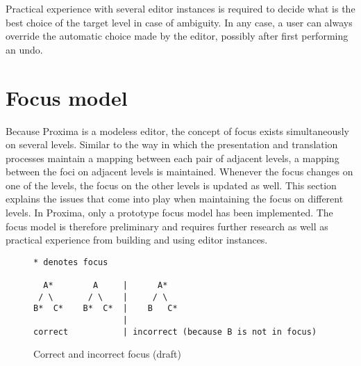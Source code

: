 Practical experience with several editor instances is required to decide what is the best choice of the target level in case of ambiguity. In any case, a user can always override the automatic choice made by the editor, possibly after first performing an undo.


\section{Focus model}




Because Proxima is a modeless editor, the concept of focus exists simultaneously on several levels.  Similar to the way in which the presentation and translation processes maintain a mapping between each pair of adjacent levels, a mapping between the foci on adjacent levels is maintained. Whenever the focus changes on one of the levels, the focus on the other levels is updated as well. This section explains the issues that come into play when maintaining the focus on different levels. In Proxima, only a prototype focus model has been implemented. The focus model is therefore preliminary and requires further research as well as practical experience from building and using editor instances. 

\begin{figure}
\begin{small}
\begin{center}
\begin{verbatim}
* denotes focus

  A*        A     |      A*
 / \       / \    |     / \
B*  C*    B*  C*  |    B   C*
                  |
correct           | incorrect (because B is not in focus)
\end{verbatim}
\caption{Correct and incorrect focus (draft)}\label{correctIncorrect focus} 
\end{center}
\end{small}
\end{figure}


